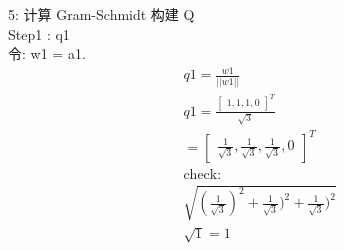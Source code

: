\documentclass[12pt]{article}
\begin{document}
\begin{flushleft}
    5: 计算 Gram-Schmidt 构建 Q \\
    Step1 : q1  \\
    令:  w1 = a1. \\
    \begin{align}
        q1 = \frac{w1}{||w1||}                                                                                \\
        q1 = \frac{\begin{bmatrix}
                       1, 1, 1, 0
                   \end{bmatrix}^{T}}{\sqrt{3}}                                                               \\
        = \begin{bmatrix}
              \frac{1}{\sqrt{3}}, \frac{1}{\sqrt{3}}, \frac{1}{\sqrt{3}}, 0
          \end{bmatrix}^{T} \\
        \text{check:}                                                                                         \\
        \sqrt{(\frac{1}{\sqrt{3}}) ^{2} + \frac{1}{\sqrt{3}}) ^{2}+ \frac{1}{\sqrt{3}}) ^{2}}                 \\
        \sqrt{1} = 1
    \end{align}


\end{flushleft}
\end{document}
